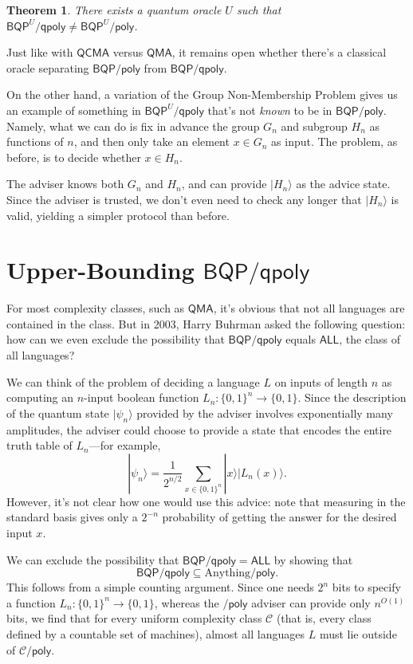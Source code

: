 \documentclass[12pt]{report}
\theoremstyle{plain}
\newtheorem{theorem}{Theorem}[section]
\theoremstyle{definition}
\renewcommand{\ket}[1]{|#1\rangle}
\begin{document}
\begin{theorem}
There exists a quantum oracle $U$ such that $\mathsf{BQP}^U\mathsf{/qpoly} \neq \mathsf{BQP}^U\mathsf{/poly}$.
\end{theorem}

Just like with $\mathsf{QCMA}$ versus $\mathsf{QMA}$, it remains open whether there's a classical oracle separating $\mathsf{BQP/poly}$ from $\mathsf{BQP/qpoly}$.

On the other hand, a variation of the Group Non-Membership Problem gives us an example of something in $\mathsf{BQP}^U\mathsf{/qpoly}$ that's not {\em known} to
be in $\mathsf{BQP/poly}$.  Namely, what we can do is fix in advance the group $G_n$ and subgroup $H_n$ as functions of $n$, and then only take an element $x\in G_n$ as input.  The problem, as before, is to decide whether $x\in H_n$.

The adviser knows both $G_n$ and $H_n$, and can provide $\ket{H_n}$ as the advice state.
Since the adviser is trusted, we don't even need to check any longer that $\ket{H_n}$ is valid, yielding a simpler protocol than before.

\section{Upper-Bounding $\mathsf{BQP/qpoly}$}

For most complexity classes, such as $\mathsf{QMA}$, it's obvious that not all languages are contained in the class.
But in 2003, Harry Buhrman asked the following question: how can we even exclude the possibility that $\mathsf{BQP}/\mathsf{qpoly}$ equals $\mathsf{ALL}$, the class of all languages?

We can think of the problem of deciding a language $L$ on inputs of length $n$ as computing an $n$-input boolean function $L_n:\{0,1\}^n \rightarrow \{0,1\}$.
Since the description of the quantum state $\ket{\psi_n}$ provided by the adviser involves exponentially many amplitudes, the adviser could choose to provide a state that encodes the entire truth table of $L_n$---for example,
$$\ket{\psi_n} = \frac{1}{2^{n/2}} \sum_{x\in\{0,1\}^n} \ket{x}\ket{L_n(x)}.$$
However, it's not clear how one would use this advice: note that measuring in the standard basis gives only a $2^{-n}$ probability of getting the answer for the desired input $x$.

We can exclude the possibility that $\mathsf{BQP/qpoly} = \mathsf{ALL}$ by showing that
\begin{equation}
  \mathsf{BQP} / \mathsf{qpoly} \subseteq \text{Anything} / \mathsf{poly}.
\end{equation}
This follows from a simple counting argument.  Since one needs $2^n$ bits to specify a function $L_n : \{0,1\}^n\rightarrow \{0,1\}$, whereas the $\mathsf{/poly}$ adviser can provide only $n^{O(1)}$ bits, we find that for every uniform complexity class $\mathcal{C}$ (that is, every class defined by
a countable set of machines), almost all languages $L$ must lie outside of $\mathcal{C}\mathsf{/poly}$.
\end{document}
